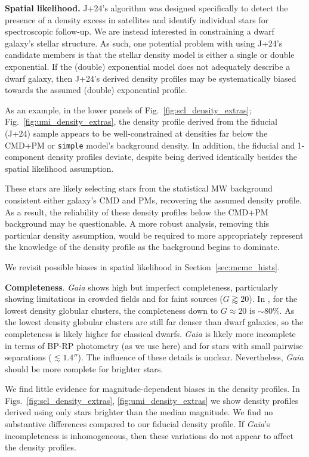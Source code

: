 \textbf{Spatial likelihood.} J+24's algorithm was designed specifically
to detect the presence of a density excess in satellites and identify
individual stars for spectroscopic follow-up. We are instead interested
in constraining a dwarf galaxy's stellar structure. As such, one
potential problem with using J+24's candidate members is that the
stellar density model is either a single or double exponential. If the
(double) exponential model does not adequately describe a dwarf galaxy,
then J+24's derived density profiles may be systematically biased
towards the assumed (double) exponential profile.

As an example, in the lower panels of Fig.~\ref{fig:scl_density_extras};
Fig.~\ref{fig:umi_density_extras}, the density profile derived from the
fiducial (J+24) sample appears to be well-constrained at densities far
below the CMD+PM or \texttt{simple} model's background density. In
addition, the fiducial and 1-component density profiles deviate, despite
being derived identically besides the spatial likelihood assumption.

These stars are likely selecting stars from the statistical MW
background consistent either galaxy's CMD and PMs, recovering the
assumed density profile. As a result, the reliability of these density
profiles below the CMD+PM background may be questionable. A more robust
analysis, removing this particular density assumption, would be required
to more appropriately represent the knowledge of the density profile as
the background begins to dominate.

We revisit possible biases in spatial likelihood in
Section~\ref{sec:mcmc_hists}.

\textbf{Completeness}. \emph{Gaia} shows high but imperfect
completeness, particularly showing limitations in crowded fields and for
faint sources (\(G\gtrapprox20\)). In \citet{fabricius+2021}, for the
lowest density globular clusters, the completeness down to
\(G\approx 20\) is \(\sim 80\%\). As the lowest density globular
clusters are still far denser than dwarf galaxies, so the completeness
is likely higher for classical dwarfs. \emph{Gaia} is likely more
incomplete in terms of BP-RP photometry (as we use here) and for stars
with small pairwise separations (\(\lesssim 1.4''\)). The influence of
these details is unclear. Nevertheless, \emph{Gaia} should be more
complete for brighter stars.

We find little evidence for magnitude-dependent biases in the density
profiles. In
Figs.~\ref{fig:scl_density_extras}, \ref{fig:umi_density_extras} we show
density profiles derived using only stars brighter than the median
magnitude. We find no substantive differences compared to our fiducial
density profile. If \emph{Gaia}'s incompleteness is inhomogeneous, then
these variations do not appear to affect the density profiles.

